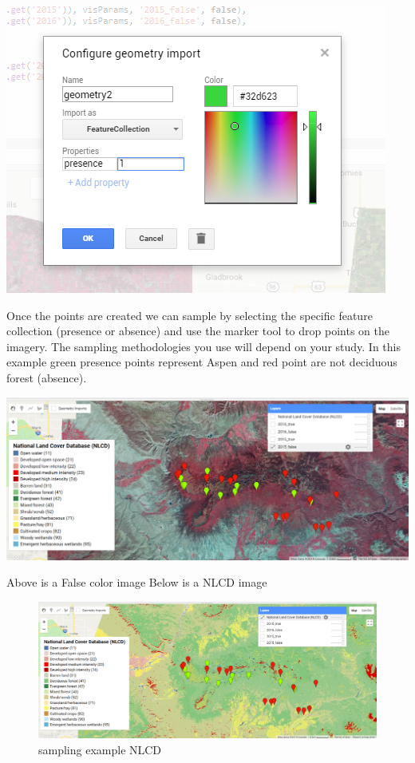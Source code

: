 \documentclass[]{article}
\begin{document}
\includegraphics{presencePoints.png}

Once the points are created we can sample by selecting the specific
feature collection (presence or absence) and use the marker tool to drop
points on the imagery. The sampling methodologies you use will depend on
your study. In this example green presence points represent Aspen and
red point are not deciduous forest (absence).

 \includegraphics{Sampling_False_Color.png}

Above is a False color image Below is a NLCD image

\begin{figure}
\centering
\includegraphics{Sampling_NLCD.png}
\caption{sampling example NLCD}
\end{figure}
\end{document}

